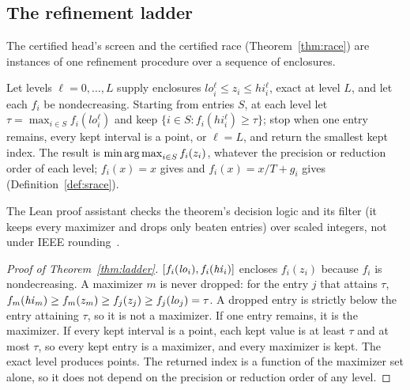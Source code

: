 \subsection{The refinement ladder}\label{app:ladder}
The certified head's screen and the certified race (Theorem~\ref{thm:race}) are instances of one refinement procedure over a sequence of enclosures.
\begin{theorem}\label{thm:ladder}
Let levels $\ell=0,\dots,L$ supply enclosures $lo^\ell_i\le z_i\le hi^\ell_i$, exact at level $L$, and let each $f_i$ be nondecreasing. Starting from entries $S$, at each level let $\tau=\max_{i\in S}f_i(lo^\ell_i)$ and keep $\{i\in S:f_i(hi^\ell_i)\ge\tau\}$; stop when one entry remains, every kept interval is a point, or $\ell=L$, and return the smallest kept index. The result is $\min\operatorname*{arg\,max}_{i\in S}f_i(z_i)$, whatever the precision or reduction order of each level; $f_i(x)=x$ gives \Rreal{} and $f_i(x)=x/T+g_i$ gives \Srace{} (Definition~\ref{def:srace}).
\end{theorem}
The Lean proof assistant checks the theorem's decision logic and its filter (it keeps every maximizer and drops only beaten entries) over scaled integers, not under IEEE rounding~.
\begin{proof}[Proof of Theorem~\ref{thm:ladder}]
$[f_i(\mathit{lo}_i),f_i(\mathit{hi}_i)]$ encloses $f_i(z_i)$ because $f_i$ is nondecreasing. A maximizer $m$ is never dropped: for the entry $j$ that attains $\tau$, $f_m(\mathit{hi}_m)\ge f_m(z_m)\ge f_j(z_j)\ge f_j(\mathit{lo}_j)=\tau$. A dropped entry is strictly below the entry attaining $\tau$, so it is not a maximizer. If one entry remains, it is the maximizer. If every kept interval is a point, each kept value is at least $\tau$ and at most $\tau$, so every kept entry is a maximizer, and every maximizer is kept. The exact level produces points. The returned index is a function of the maximizer set alone, so it does not depend on the precision or reduction order of any level.
\end{proof}

